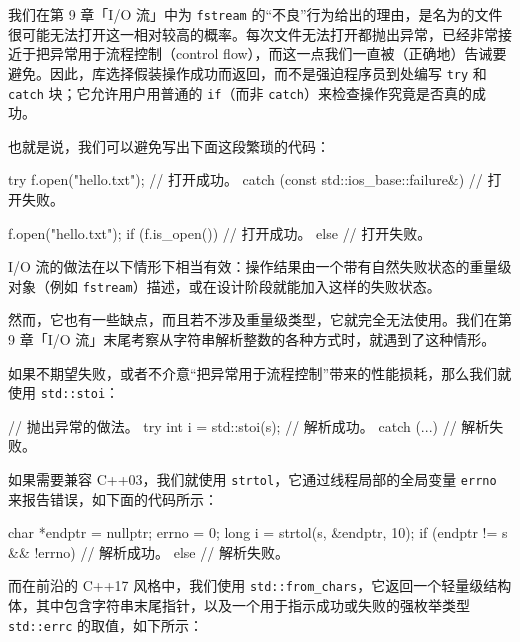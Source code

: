 我们在第 9 章「I/O 流」中为 \texttt{fstream} 的“不良”行为给出的理由，是名为的文件很可能无法打开这一相对较高的概率。每次文件无法打开都抛出异常，已经非常接近于把异常用于流程控制（control flow），而这一点我们一直被（正确地）告诫要避免。因此，库选择假装操作成功而返回，而不是强迫程序员到处编写 \texttt{try} 和 \texttt{catch} 块；它允许用户用普通的 \texttt{if}（而非 \texttt{catch}）来检查操作究竟是否真的成功。

也就是说，我们可以避免写出下面这段繁琐的代码：

\begin{codebox}[cpp]
    try {
      f.open("hello.txt");
      // 打开成功。
    } catch (const std::ios_base::failure&) {
      // 打开失败。
    }
\end{codebox}

\begin{codebox}[cpp]
    f.open("hello.txt");
    if (f.is_open()) {
      // 打开成功。
    } else {
      // 打开失败。
    }
\end{codebox}

I/O 流的做法在以下情形下相当有效：操作结果由一个带有自然失败状态的重量级对象（例如 \texttt{fstream}）描述，或在设计阶段就能加入这样的失败状态。

然而，它也有一些缺点，而且若不涉及重量级类型，它就完全无法使用。我们在第 9 章「I/O 流」末尾考察从字符串解析整数的各种方式时，就遇到了这种情形。

如果不期望失败，或者不介意“把异常用于流程控制”带来的性能损耗，那么我们就使用 \texttt{std::\allowbreak{}stoi}：

\begin{codebox}[cpp]
    // 抛出异常的做法。
    try {
      int i = std::stoi(s);
      // 解析成功。
    } catch (...) {
      // 解析失败。
    }
\end{codebox}

如果需要兼容 C++03，我们就使用 \texttt{strtol}，它通过线程局部的全局变量 \texttt{errno} 来报告错误，如下面的代码所示：

\begin{codebox}[cpp]
    char *endptr = nullptr;
    errno = 0;
    long i = strtol(s, &endptr, 10);
    if (endptr != s && !errno) {
      // 解析成功。
    } else {
      // 解析失败。
    }
\end{codebox}

而在前沿的 C++17 风格中，我们使用 \texttt{std::\allowbreak{}from\_\allowbreak{}chars}，它返回一个轻量级结构体，其中包含字符串末尾指针，以及一个用于指示成功或失败的强枚举类型 \texttt{std::\allowbreak{}errc} 的取值，如下所示：

